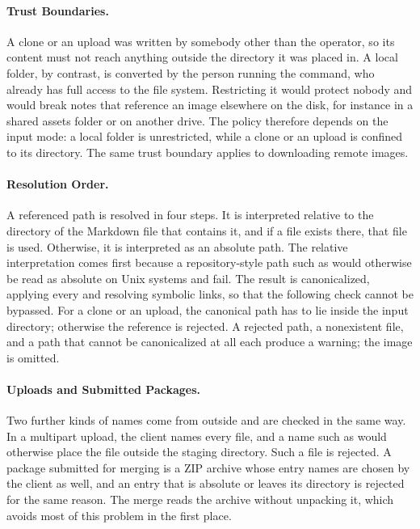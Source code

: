 \paragraph{Trust Boundaries.}
A clone or an upload was written by somebody other than the operator, so its content must not
reach anything outside the directory it was placed in.
A local folder, by contrast, is converted by the person running the command, who already has full access to the
file system.
Restricting it would protect nobody and would break notes that reference an image elsewhere on the
disk, for instance in a shared assets folder or on another drive.
The policy therefore depends on the input mode: a local folder is unrestricted, while a clone or an
upload is confined to its directory.
The same trust boundary applies to downloading remote images.

\paragraph{Resolution Order.}
A referenced path is resolved in four steps.
 It is interpreted relative to the directory of the Markdown file that contains it, and
if a file exists there, that file is used.
 Otherwise, it is interpreted as an absolute path.
The relative interpretation comes first because a repository-style path such as
 would otherwise be read as absolute on Unix systems and fail.
 The result is canonicalized, applying every  and resolving symbolic links,
so that the following check cannot be bypassed.
 For a clone or an upload, the canonical path has to lie inside the input directory;
otherwise the reference is rejected.
A rejected path, a nonexistent file, and a path that cannot be canonicalized at all
each produce a warning; the image is omitted.

\paragraph{Uploads and Submitted Packages.}
Two further kinds of names come from outside and are checked in the same way.
In a multipart upload, the client names every file, and a name such as  would
otherwise place the file outside the staging directory. Such a file is rejected.
A package submitted for merging is a ZIP archive whose entry names are chosen
by the client as well, and an entry that is absolute or leaves its directory is rejected for the same
reason.
The merge reads the archive without unpacking it, which avoids most of this problem in the first
place.

